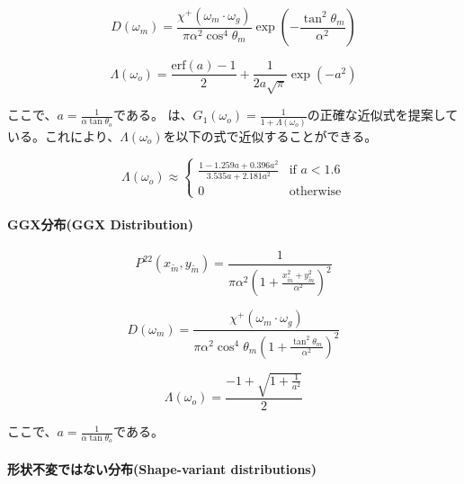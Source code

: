 \documentclass[a4j,xelatex,ja=standard]{bxjsarticle}
\begin{document}
\begin{equation}
    D(\omega_m) = \frac{\chi^+(\omega_m \cdot \omega_g)}{\pi \alpha^2 \cos^4 \theta_m} \exp\left( -\frac{\tan^2 \theta_m}{\alpha^2} \right)
    \label{eq:68}
\end{equation}

\begin{equation}
    \Lambda(\omega_o) = \frac{\text{erf}(a) - 1}{2} + \frac{1}{2a \sqrt{\pi}} \exp(-a^2)
    \label{eq:69}
\end{equation}

ここで、$a = \frac{1}{\alpha\tan\theta_o}$である。\citeauthor{Walter2007} \cite{Walter2007}は、$G_1(\omega_o) = \frac{1}{1 + \Lambda(\omega_o)}$の正確な近似式を提案している。これにより、$\Lambda(\omega_o)$を以下の式で近似することができる。

\begin{equation*}
    \Lambda(\omega_o) \approx
    \begin{cases}
        \frac{1 - 1.259a + 0.396a^2}{3.535a + 2.181a^2} & \text{if } a < 1.6 \\
        0 & \text{otherwise}
    \end{cases}
\end{equation*}

\paragraph{GGX分布(GGX Distribution)}

\begin{equation}
    P^{22}(x_{\tilde{m}}, y_{\tilde{m}}) = \frac{1}{\pi\alpha^2 \left(1 +  \frac{x_{\tilde{m}}^2 + y_{\tilde{m}}^2}{\alpha^2} \right)^2}
    \label{eq:70}
\end{equation}

\begin{equation}
    D(\omega_m) = \frac{\chi^+(\omega_m \cdot \omega_g)}{\pi \alpha^2 \cos^4 \theta_m \left( 1 + \frac{\tan^2 \theta_m}{\alpha^2} \right)^2}
    \label{eq:71}
\end{equation}

\begin{equation}
    \Lambda(\omega_o) = \frac{-1 + \sqrt{1 + \frac{1}{a^2}}}{2}
    \label{eq:72}
\end{equation}

ここで、$a = \frac{1}{\alpha \tan \theta_o}$である。

\paragraph{形状不変ではない分布(Shape-variant distributions)}
\end{document}
